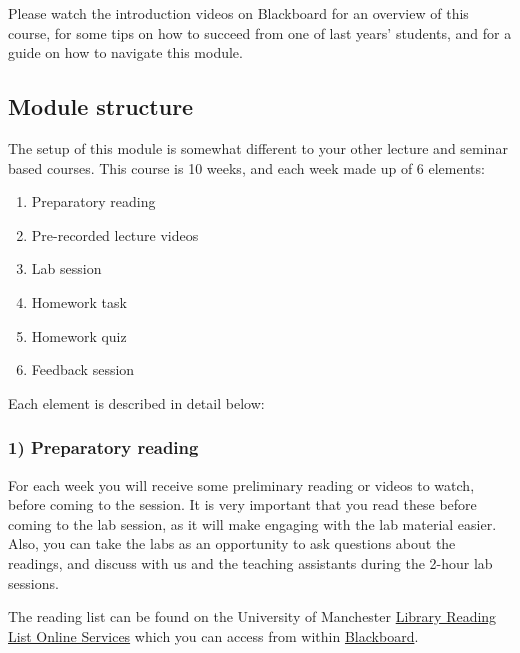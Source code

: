 \documentclass[
]{book}
\providecommand{\tightlist}{%
  \setlength{\itemsep}{0pt}\setlength{\parskip}{0pt}}
\begin{document}
Please watch the introduction videos on Blackboard for an overview of this course, for some tips on how to succeed from one of last years' students, and for a guide on how to navigate this module.

\hypertarget{module-structure}{%
\subsection*{Module structure}\label{module-structure}}

The setup of this module is somewhat different to your other lecture and seminar based courses. This course is 10 weeks, and each week made up of 6 elements:

\begin{enumerate}
\def\labelenumi{\arabic{enumi})}
\tightlist
\item
  Preparatory reading
\item
  Pre-recorded lecture videos
\item
  Lab session
\item
  Homework task
\item
  Homework quiz
\item
  Feedback session
\end{enumerate}

Each element is described in detail below:

\hypertarget{preparatory-reading}{%
\subsubsection*{1) Preparatory reading}\label{preparatory-reading}}

For each week you will receive some preliminary reading or videos to watch, before coming to the session. It is very important that you read these before coming to the lab session, as it will make engaging with the lab material easier. Also, you can take the labs as an opportunity to ask questions about the readings, and discuss with us and the teaching assistants during the 2-hour lab sessions.

The reading list can be found on the University of Manchester \href{https://www.library.manchester.ac.uk/search-resources/reading-lists/}{Library Reading List Online Services} which you can access from within \href{https://online.manchester.ac.uk/webapps/blackboard/content/listContentEditable.jsp?content_id=_12745591_1\&course_id=_67464_1}{Blackboard}.
\end{document}
